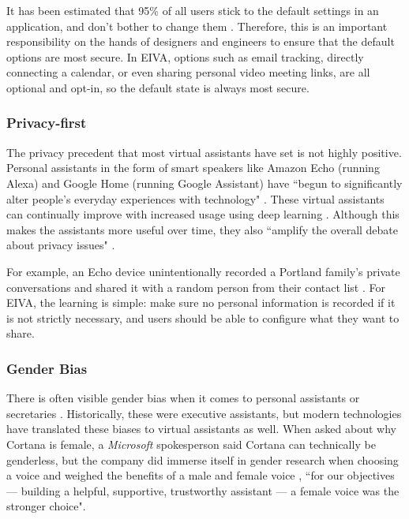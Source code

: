\documentclass{article}
\begin{document}
It has been estimated that 95\% of all users stick to the default settings in an application, and don't bother to change them \cite{catalanotto_95_2019}. Therefore, this is an important responsibility on the hands of designers and engineers to ensure that the default options are most secure. In EIVA, options such as email tracking, directly connecting a calendar, or even sharing personal video meeting links, are all optional and opt-in, so the default state is always most secure.

\subsubsection{Privacy-first}

The privacy precedent that most virtual assistants have set is not highly positive. Personal assistants in the form of smart speakers like Amazon Echo (running Alexa) and Google Home (running Google Assistant) have ``begun to significantly alter people’s everyday experiences with technology" \cite{pridmore_personal_2020}. These virtual assistants can continually improve with increased usage using deep learning \cite{kepuska_next-generation_2018}. Although this makes the assistants more useful over time, they also ``amplify the overall debate about privacy issues" \cite{zeng_end_2017}.

For example, an Echo device unintentionally recorded a Portland family's private conversations and shared it with a random person from their contact list \cite{noauthor_this_nodate-1}. For EIVA, the learning is simple: make sure no personal information is recorded if it is not strictly necessary, and users should be able to configure what they want to share.

\subsubsection{Gender Bias}

There is often visible gender bias when it comes to personal assistants or secretaries \cite{noauthor_why_2018}. Historically, these were executive assistants, but modern technologies have translated these biases to virtual assistants as well. When asked about why Cortana is female, a \emph{Microsoft} spokesperson said Cortana can technically be genderless, but the company did immerse itself in gender research when choosing a voice and weighed the benefits of a male and female voice \cite{pcmag_real_2018}, ``for our objectives — building a helpful, supportive, trustworthy assistant — a female voice was the stronger choice".
\end{document}
